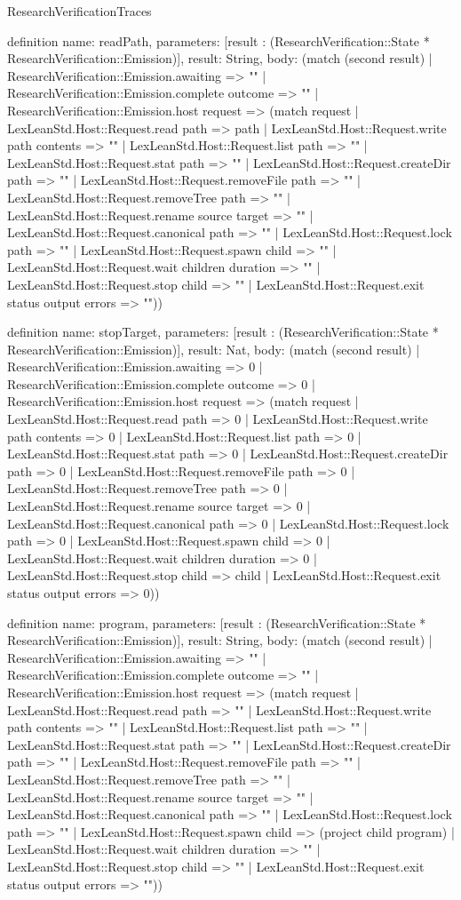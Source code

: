 \begin{lexlean}{ResearchVerificationTraces}
\begin{semanticmodule}
definition{
  name: readPath,
  parameters: [result : (ResearchVerification::State * ResearchVerification::Emission)],
  result: String,
  body: (match (second result) | ResearchVerification::Emission.awaiting => "" | ResearchVerification::Emission.complete outcome => "" | ResearchVerification::Emission.host request => (match request | LexLeanStd.Host::Request.read path => path | LexLeanStd.Host::Request.write path contents => "" | LexLeanStd.Host::Request.list path => "" | LexLeanStd.Host::Request.stat path => "" | LexLeanStd.Host::Request.createDir path => "" | LexLeanStd.Host::Request.removeFile path => "" | LexLeanStd.Host::Request.removeTree path => "" | LexLeanStd.Host::Request.rename source target => "" | LexLeanStd.Host::Request.canonical path => "" | LexLeanStd.Host::Request.lock path => "" | LexLeanStd.Host::Request.spawn child => "" | LexLeanStd.Host::Request.wait children duration => "" | LexLeanStd.Host::Request.stop child => "" | LexLeanStd.Host::Request.exit status output errors => ""))
}

definition{
  name: stopTarget,
  parameters: [result : (ResearchVerification::State * ResearchVerification::Emission)],
  result: Nat,
  body: (match (second result) | ResearchVerification::Emission.awaiting => 0 | ResearchVerification::Emission.complete outcome => 0 | ResearchVerification::Emission.host request => (match request | LexLeanStd.Host::Request.read path => 0 | LexLeanStd.Host::Request.write path contents => 0 | LexLeanStd.Host::Request.list path => 0 | LexLeanStd.Host::Request.stat path => 0 | LexLeanStd.Host::Request.createDir path => 0 | LexLeanStd.Host::Request.removeFile path => 0 | LexLeanStd.Host::Request.removeTree path => 0 | LexLeanStd.Host::Request.rename source target => 0 | LexLeanStd.Host::Request.canonical path => 0 | LexLeanStd.Host::Request.lock path => 0 | LexLeanStd.Host::Request.spawn child => 0 | LexLeanStd.Host::Request.wait children duration => 0 | LexLeanStd.Host::Request.stop child => child | LexLeanStd.Host::Request.exit status output errors => 0))
}

definition{
  name: program,
  parameters: [result : (ResearchVerification::State * ResearchVerification::Emission)],
  result: String,
  body: (match (second result) | ResearchVerification::Emission.awaiting => "" | ResearchVerification::Emission.complete outcome => "" | ResearchVerification::Emission.host request => (match request | LexLeanStd.Host::Request.read path => "" | LexLeanStd.Host::Request.write path contents => "" | LexLeanStd.Host::Request.list path => "" | LexLeanStd.Host::Request.stat path => "" | LexLeanStd.Host::Request.createDir path => "" | LexLeanStd.Host::Request.removeFile path => "" | LexLeanStd.Host::Request.removeTree path => "" | LexLeanStd.Host::Request.rename source target => "" | LexLeanStd.Host::Request.canonical path => "" | LexLeanStd.Host::Request.lock path => "" | LexLeanStd.Host::Request.spawn child => (project child program) | LexLeanStd.Host::Request.wait children duration => "" | LexLeanStd.Host::Request.stop child => "" | LexLeanStd.Host::Request.exit status output errors => ""))
}


\end{semanticmodule}
\end{lexlean}
